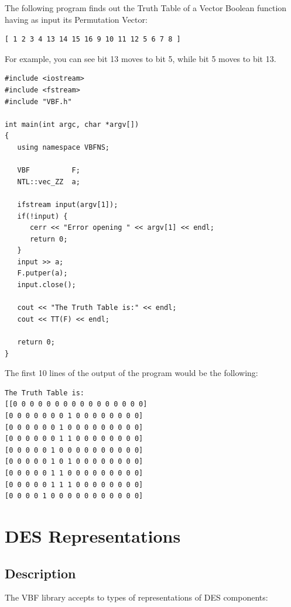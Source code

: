 \begin{example}
The following program finds out the Truth Table of a Vector Boolean function having as input its Permutation Vector:

\begin{verbatim}
[ 1 2 3 4 13 14 15 16 9 10 11 12 5 6 7 8 ]
\end{verbatim}

For example, you can see bit 13 moves to bit 5, while bit 5 moves to bit 13.

\begin{verbatim}
#include <iostream>
#include <fstream>
#include "VBF.h"

int main(int argc, char *argv[])
{
   using namespace VBFNS;

   VBF          F;
   NTL::vec_ZZ  a;

   ifstream input(argv[1]);
   if(!input) {
      cerr << "Error opening " << argv[1] << endl;
      return 0;
   }
   input >> a;
   F.putper(a);
   input.close();

   cout << "The Truth Table is:" << endl;
   cout << TT(F) << endl;

   return 0;
}
\end{verbatim}

The first 10 lines of the output of the program would be the following:

\begin{verbatim}
The Truth Table is:
[[0 0 0 0 0 0 0 0 0 0 0 0 0 0 0 0]
[0 0 0 0 0 0 0 1 0 0 0 0 0 0 0 0]
[0 0 0 0 0 0 1 0 0 0 0 0 0 0 0 0]
[0 0 0 0 0 0 1 1 0 0 0 0 0 0 0 0]
[0 0 0 0 0 1 0 0 0 0 0 0 0 0 0 0]
[0 0 0 0 0 1 0 1 0 0 0 0 0 0 0 0]
[0 0 0 0 0 1 1 0 0 0 0 0 0 0 0 0]
[0 0 0 0 0 1 1 1 0 0 0 0 0 0 0 0]
[0 0 0 0 1 0 0 0 0 0 0 0 0 0 0 0]
\end{verbatim}
\end{example}

\section{DES Representations}
\label{sec:DESRep}

\subsection{Description}

The VBF library accepts to types of representations of DES \cite{DES:77} components:

